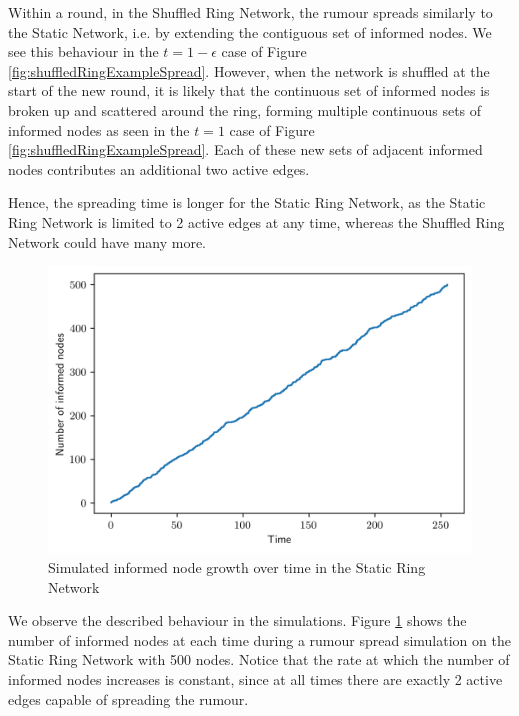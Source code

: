Within a round, in the Shuffled Ring Network, the rumour spreads similarly to the Static Network, i.e. by extending the contiguous set of informed nodes. We see this behaviour in the $t = 1 - \epsilon$ case of Figure \ref{fig:shuffledRingExampleSpread}. However, when the network is shuffled at the start of the new round, it is likely that the continuous set of informed nodes is broken up and scattered around the ring, forming multiple continuous sets of informed nodes as seen in the $t=1$ case of Figure \ref{fig:shuffledRingExampleSpread}. Each of these new sets of adjacent informed nodes contributes an additional two active edges.

Hence, the spreading time is longer for the Static Ring Network, as the Static Ring Network is limited to 2 active edges at any time, whereas the Shuffled Ring Network could have many more.

\begin{figure}[h]
	\centering
	\includegraphics[width=\textwidth]{./figures/static_ring_informed_node_growth.png}
	\caption{Simulated informed node growth over time in the Static Ring Network}
	\label{fig:staticRingInformedNodeGrowth}
\end{figure}

We observe the described behaviour in the simulations. %
Figure \ref{fig:staticRingInformedNodeGrowth} shows the number of informed nodes at each time during a rumour spread simulation on the Static Ring Network with 500 nodes. Notice that the rate at which the number of informed nodes increases is constant, since at all times there are exactly 2 active edges capable of spreading the rumour.

